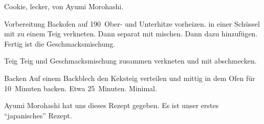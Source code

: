 \begin{recipe}{Cookie, lecker, von Ayumi Morohashi.}
	\item[Vorbereitung] Backofen auf 190\textcelsius~Ober- und Unterhitze vorheizen.
	 in einer Schüssel mit
	 zu einem Teig verkneten. Dann separat
	 mit
	 mischen. Dann dazu
	 hinzufügen. Fertig ist die Geschmacksmischung.
	\item[Teig] Teig und Geschmacksmischung zusammen verkneten und mit 
	 abschmecken.
	\item[Backen] Auf einem Backblech den Keksteig verteilen und mittig in dem Ofen für 10~Minuten backen.
	\preparationtime Etwa 25~Minuten.
	\washingup Minimal.
	\item Ayumi Morohashi hat uns dieses Rezept gegeben. Es ist unser erstes \enquote{japanisches} Rezept.
\end{recipe}
